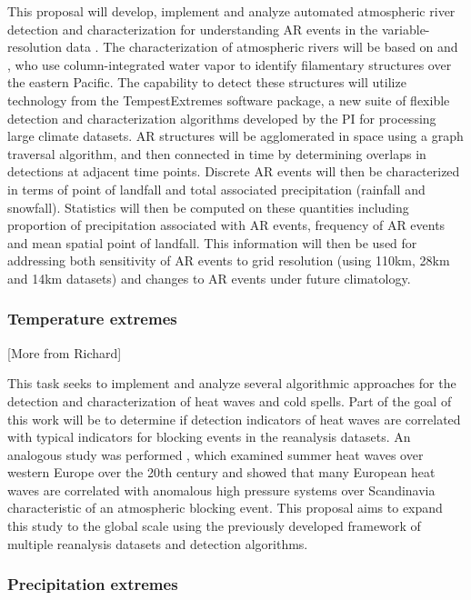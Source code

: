 \documentclass[11pt]{article}
\begin{document}
This proposal will develop, implement and analyze automated atmospheric river detection and characterization for understanding AR events in the variable-resolution data \citep{ralph2004satellite, lavers2012detection}.  The characterization of atmospheric rivers will be based on \cite{neiman2008meteorological} and \cite{guan2010extreme}, who use column-integrated water vapor to identify filamentary structures over the eastern Pacific.  The capability to detect these structures will utilize technology from the TempestExtremes software package, a new suite of flexible detection and characterization algorithms developed by the PI for processing large climate datasets.  AR structures will be agglomerated in space using a graph traversal algorithm, and then connected in time by determining overlaps in detections at adjacent time points.  Discrete AR events will then be characterized in terms of point of landfall and total associated precipitation (rainfall and snowfall).  Statistics will then be computed on these quantities including proportion of precipitation associated with AR events, frequency of AR events and mean spatial point of landfall.  This information will then be used for addressing both sensitivity of AR events to grid resolution (using 110km, 28km and 14km datasets) and changes to AR events under future climatology.

\subsubsection{Temperature extremes}

{\color{red}[More from Richard]}

This task seeks to implement and analyze several algorithmic approaches for the detection and characterization of heat waves and cold spells.  Part of the goal of this work will be to determine if detection indicators of heat waves are correlated with typical indicators for blocking events in the reanalysis datasets.  An analogous study was performed \cite{della2007summer}, which examined summer heat waves over western Europe over the 20th century and showed that many European heat waves are correlated with anomalous high pressure systems over Scandinavia characteristic of an atmospheric blocking event.  This proposal aims to expand this study to the global scale using the previously developed framework of multiple reanalysis datasets and detection algorithms.

\subsubsection{Precipitation extremes}
\end{document}
